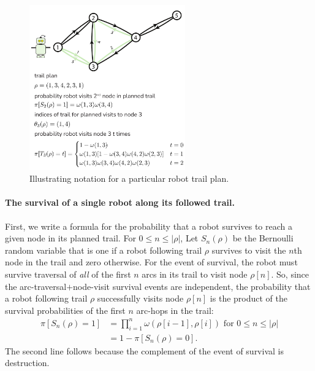 \documentclass[11pt, oneside]{article}
\begin{document}
\begin{figure}[h!]
    \centering
    	\includegraphics[width=0.6\textwidth]{drawings/notation_fig/notation.pdf}
    \caption{Illustrating notation for a particular robot trail plan.} \label{fig:notation}
\end{figure}

\paragraph{The survival of a single robot along its followed trail.} First, we write a formula for the probability that a robot survives to reach a given node in its planned trail.
For $0 \leq n \leq \lvert \rho \rvert$, 
Let $S_n(\rho)$ be the Bernoulli random variable that is one if a robot following trail $\rho$ survives to visit the $n$th node in the trail and zero otherwise. For the event of survival, the robot must survive traversal of \emph{all} of the first $n$ arcs in its trail to visit node $\rho[n]$. So, since the arc-traversal$+$node-visit survival events are independent, the probability that a robot following trail $\rho$ successfully visits node $\rho[n]$ is the product of the survival probabilities of the first $n$ arc-hops in the trail:
\begin{align}
	\pi[S_n(\rho) = 1] & = \prod_{i=1}^n \omega(\rho[i-1], \rho[i]) \label{eq:pi_S_n} \text{ for } 0 \leq n \leq \lvert \rho \rvert \\%
	& = 1 - \pi[S_n(\rho) = 0]. \label{eq:pi_S_n_0} 
\end{align} %
The second line follows because the complement of the event of survival is destruction.
\end{document}
